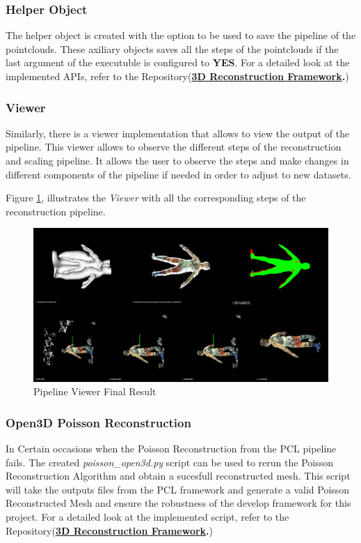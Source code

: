 \documentclass[12pt]{report}
\begin{document}
\subsubsection*{Helper Object}
The helper object is created with the option to be used to save the pipeline of the pointclouds. These axiliary objects saves all the steps of the pointclouds if the last argument of the executuble is configured to \textbf{YES}.
For a detailed look at the implemented APIs, refer to the Repository(\textbf{\href{https://github.com/esteban-andrade/3D-Reconstructrion-Scanner} {3D Reconstruction Framework}.})



\subsubsection*{Viewer}
Similarly, there is a viewer implementation that allows to view the output of the pipeline. This viewer allows to observe the different steps of the reconstruction and scaling pipeline.
It allows the user to observe the steps and make changes in different components of the pipeline if needed in order to adjust to new datasets.

Figure \ref{fig:pipeline_final}, illustrates the \textit{Viewer} with all the corresponding steps of the reconstruction pipeline.

\begin{figure}[H]%
  \centering
 \includegraphics[width=1\textwidth]{pipeline.png}
\caption{Pipeline Viewer Final Result}
\label{fig:pipeline_final} 
\end{figure}


\subsubsection*{Open3D Poisson Reconstruction}
In Certain occasions when the Poisson Reconstruction from the PCL pipeline fails. The created \textit{poisson\_open3d.py} script can be used to rerun the Poisson Reconstruction Algorithm and obtain a sucesfull reconstructed mesh.
This script will take the outputs files from the PCL framework and generate a valid Poisson Reconstructed Mesh and ensure the robustness of the develop framework for this project.
For a detailed look at the implemented script, refer to the Repository(\textbf{\href{https://github.com/esteban-andrade/3D-Reconstructrion-Scanner} {3D Reconstruction Framework}.})
\end{document}
